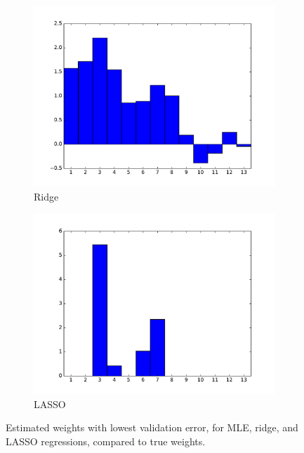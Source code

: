 \documentclass[10pt,psamsfonts]{amsart}
\theoremstyle{definition}
\theoremstyle{remark}
\numberwithin{equation}{section}
\begin{document}
\begin{figure}
\begin{subfigure}[b]{0.24\textwidth}
		\includegraphics[width=\textwidth]{hw1_4-2_3.pdf}
		\caption{Ridge}
	\end{subfigure}
	\begin{subfigure}[b]{0.24\textwidth}
		\includegraphics[width=\textwidth]{hw1_4-2_4.pdf}
		\caption{LASSO}
	\end{subfigure}
	\caption{Estimated weights with lowest validation error, for MLE, ridge, and LASSO regressions, compared to true weights.}
\end{figure}
\end{document}
